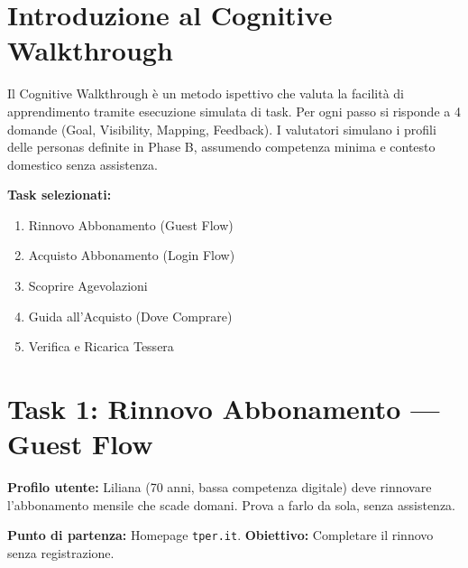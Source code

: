 \vspace{0.3cm}

\section{Introduzione al Cognitive Walkthrough}

\begin{tcolorbox}[colback=backgroundColor,colframe=borderColor,arc=2mm]
\small
Il Cognitive Walkthrough \`e un metodo ispettivo che valuta la facilit\`a di apprendimento tramite esecuzione simulata di task. Per ogni passo si risponde a 4 domande (Goal, Visibility, Mapping, Feedback). I valutatori simulano i profili delle personas definite in Phase B, assumendo competenza minima e contesto domestico senza assistenza.

\vspace{0.2cm}
\noindent\textbf{Task selezionati:}
\begin{enumerate}
 \item Rinnovo Abbonamento (Guest Flow)
 \item Acquisto Abbonamento (Login Flow)
 \item Scoprire Agevolazioni
 \item Guida all'Acquisto (Dove Comprare)
 \item Verifica e Ricarica Tessera
\end{enumerate}
\end{tcolorbox}

\vspace{0.5cm}

\section{Task 1: Rinnovo Abbonamento --- Guest Flow}

\begin{tcolorbox}[colback=primaryColor!10,colframe=primaryColor,arc=2mm]
\small
\textbf{Profilo utente:} Liliana (70 anni, bassa competenza digitale) deve rinnovare l'abbonamento mensile che scade domani. Prova a farlo da sola, senza assistenza.

\textbf{Punto di partenza:} Homepage \texttt{tper.it}. \textbf{Obiettivo:} Completare il rinnovo senza registrazione.
\end{tcolorbox}

